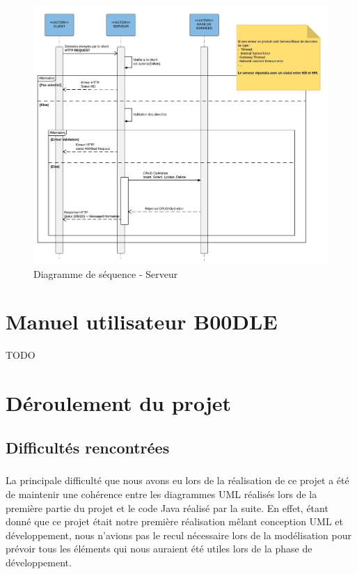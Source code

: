 \documentclass[titlepage]{report}
\begin{document}
\begin{figure}[h]
	\caption{Diagramme de séquence - Serveur}
	\label{diagramme_sequence_serveur}
	\centering
	\includegraphics[width=\textwidth]{figures/diagrammes/sequence_serveur.png}
\end{figure}

\clearpage

\chapter{Manuel utilisateur B00DLE}

TODO

\chapter{Déroulement du projet}

\section{Difficultés rencontrées}

\paragraph{} La principale difficulté que nous avons eu lors de la réalisation de ce projet a été de maintenir une cohérence entre les diagrammes UML réalisés lors de la première partie du projet et le code Java réalisé par la suite.
En effet, étant donné que ce projet était notre première réalisation mêlant conception UML et développement, nous n'avions pas le recul nécessaire lors de la modélisation pour prévoir tous les éléments qui nous auraient été utiles lors de la phase de développement.
\end{document}

